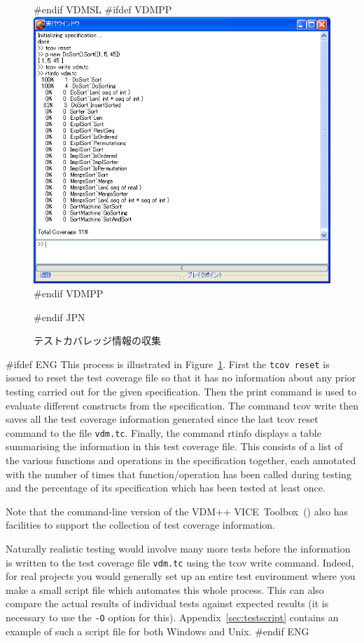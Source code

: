 \documentclass[\pformat,12pt]{article}
\newcommand{\vdmslpp}{VDM-SL}
\newcommand{\Toolbox}{Toolbox}
\newcommand{\vdmslpp}{VDM++}
\newcommand{\Toolbox}{Toolbox}
\renewcommand{\vdmslpp}{VDM++ VICE}
\newcommand{\guicmd}[1]{{\sf #1}}
\newcommand{\guicmd}[1]{{\gt #1}}
\begin{document}
\begin{figure}[tbh]
\begin{center}
#endif VDMSL
#ifdef VDMPP
\includegraphics[width=12.5cm]{testCov-pp.png}
#endif VDMPP
\caption{テストカバレッジ情報の収集}
#endif JPN
\label{fig:guitcov}
\end{center}
\end{figure}

#ifdef ENG
This process is illustrated in Figure~\ref{fig:guitcov}. First the 
{\tt tcov reset} is issued to
reset the test coverage file so that it has no information about any
prior testing carried out for the given specification. Then the
\guicmd{print} command is used to evaluate different constructs from
the specification. The command \guicmd{tcov write} then saves all the test coverage information
generated since the last \guicmd{tcov reset} command to the file
\texttt{vdm.tc}. Finally, the command \guicmd{rtinfo} 
displays a table summarising the information in
this test coverage 
file. This consists of a list of the various functions and operations
in the specification together, each annotated with the number of times
that function/operation has been called during testing and the
percentage of its specification which has been tested at least once.

Note that the command-line version of the \vdmslpp\ \Toolbox\ 
() also
has facilities to support the collection of test coverage
information.

Naturally realistic testing would involve many more tests before the
information is written to the test coverage file \texttt{vdm.tc} using the
\guicmd{tcov write} command. Indeed, for
real projects you would generally set up an entire test environment 
where you make a small script file which automates this whole
process. This can also compare the actual results of individual tests
against expected results (it is necessary to use the {\tt -O} option
for this).  Appendix~\ref{sec:testscript} contains an example of such
a script file for both Windows and Unix.
#endif ENG
\end{document}
